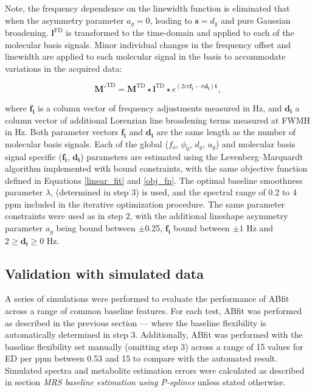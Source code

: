 \documentclass[num-refs]{wiley-article}
\begin{document}
Note, the frequency dependence on the linewidth function is eliminated that when the asymmetry parameter $a_{g}=0$, leading to $\mathbf{s}=d_{g}$ and pure Gaussian broadening. $\mathbf{l}^{\mathrm{FD}}$ is transformed to the time-domain and applied to each of the molecular basis signals. Minor individual changes in the frequency offset and linewidth are applied to each molecular signal in the basis to accommodate variations in the acquired data:

\begin{equation}
  \mathbf{M}'^{\mathrm{TD}} = \mathbf{M}^{\mathrm{TD}} \star \mathbf{l}^{\mathrm{TD}} \star e^{(2i \pi \mathbf{f_{i}} - \pi \mathbf{d_{i}} ) \mathbf{t}},
\end{equation}

where $\mathbf{f_{i}}$ is a column vector of frequency adjustments measured in Hz, and $\mathbf{d_{i}}$ a column vector of additional Lorenzian line broadening terms measured at FWMH in Hz. Both parameter vectors $\mathbf{f_{i}}$ and $\mathbf{d_{i}}$ are the same length as the number of molecular basis signals. Each of the global ($f_{o}$, $\phi_{0}$, $d_{g}$, $a_{g}$) and molecular basis signal specific ($\mathbf{f_{i}}$, $\mathbf{d_{i}}$) parameters are estimated using the Levenberg–Marquardt algorithm \cite{Levenberg1944} implemented with bound constraints, with the same objective function defined in Equations \ref{linear_fit} and \ref{obj_fn}. The optimal baseline smoothness parameter $\lambda$, (determined in step 3) is used, and the spectral range of 0.2 to 4 ppm included in the iterative optimization procedure. The same parameter constraints were used as in step 2, with the additional lineshape asymmetry parameter $a_{g}$ being bound between $\pm$0.25, $\mathbf{f_{i}}$ bound between $\pm1$ Hz and  $2 \geq \mathbf{d_{i}} \geq 0$ Hz.

\subsection{Validation with simulated data}
A series of simulations were performed to evaluate the performance of ABfit across a range of common baseline features. For each test, ABfit was performed as described in the previous section --- where the baseline flexibility is automatically determined in step 3. Additionally, ABfit was performed with the baseline flexibility set manually (omitting step 3) across a range of 15 values for ED per ppm between 0.53 and 15 to compare with the automated result. Simulated spectra and metabolite estimation errors were calculated as described in section \textit{MRS baseline estimation using P-splines} unless stated otherwise.
\end{document}
